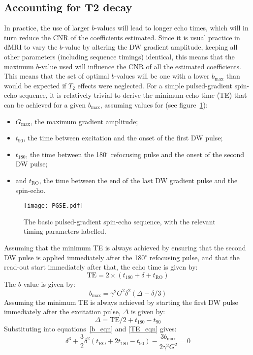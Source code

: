 \documentclass{article}
\begin{document}
\subsection{Accounting for T2 decay}

In practice, the use of larger $b$-values will lead to longer echo times, which will
in turn reduce the CNR of the coefficients estimated. Since it is usual
practice in dMRI to vary the $b$-value by altering the DW gradient amplitude,
keeping all other parameters (including sequence timings) identical, this means
that the maximum $b$-value used will influence the CNR of all the estimated
coefficients. This means that the set of optimal $b$-values will be one with a
lower $b_{\textrm{max}}$ than would be expected if $T_2$ effects were
neglected. For a simple pulsed-gradient spin-echo sequence, it is relatively
trivial to derive the minimum echo time (TE) that can be achieved for a given
$b_{\textrm{max}}$, assuming values for (see figure~\ref{PGSE}):
\begin{itemize}
\item $G_{\textrm{max}}$, the maximum gradient amplitude;
\item $t_{\textrm{90}}$, the time between excitation and the onset of the first DW
pulse;
\item $t_{\textrm{180}}$, the time between the 180$^\circ$ refocusing pulse and
the onset of the second DW pulse;
\item and $t_{\textrm{RO}}$, the time between the end
of the last DW gradient pulse and the spin-echo.
\end{itemize}

\begin{figure}[htbp]
\centering
\texttt{[image: PGSE.pdf]} 
\caption{The basic pulsed-gradient spin-echo sequence, with the relevant timing parameters labelled.}
\label{PGSE}
\end{figure}

Assuming that the minimum TE is always achieved by ensuring that the second DW 
pulse is applied immediately after the 180$^\circ$ refocusing pulse, and that 
the read-out start immediately after that, the echo time is given by:
\begin{equation}
\label{TE_eqn}
\textrm{TE} = 2 \times ( t_{180} + \delta + t_{\textrm{RO}} )
\end{equation}
The $b$-value is given by:
\begin{equation}
\label{b_eqn}
b_{\textrm{max}} = \gamma^2 G^2 \delta^2 (\Delta - \delta/3)
\end{equation}
Assuming the minimum TE is always achieved by starting the first DW pulse 
immediately after the excitation pulse, $\Delta$ is given by:
\begin{equation}
\Delta = \textrm{TE}/2 + t_{180} - t_{90}
\end{equation}
Substituting into equations~\ref{b_eqn} and \ref{TE_eqn} gives:
\begin{equation}
\delta^3 + \frac{3}{2} \delta^2 (t_{\textrm{RO}} + 2 t_{180} - t_{90}) - \frac{3 b_{\textrm{max}}}{2\gamma^2 G^2} = 0
\end{equation}
\end{document}
